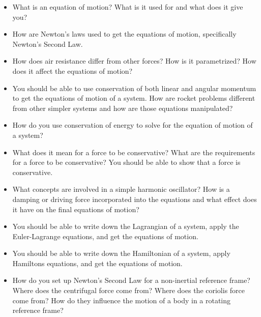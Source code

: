 \begin{itemize}[itemsep=0pt,parsep=0pt,topsep=0pt,partopsep=0pt]
\item What is an equation of motion? What is it used for and what does it give you?
\item How are Newton's laws used to get the equations of motion, specifically
Newton's Second Law.
\item How does air resistance differ from other forces? How is it parametrized?
How does it affect the equations of motion?
\item You should be able to use conservation of both linear and angular momentum
to get the equations of motion of a system. How are rocket problems different
from other simpler systems and how are those equations manipulated?
\item How do you use conservation of energy to solve for the equation
of motion of a system?
\item What does it mean for a force to be conservative? What are the requirements
for a force to be conservative? You should be able to show that a force is
conservative.
\item What concepts are involved in a simple harmonic oscillator? How is a damping or
driving force incorporated into the equations and what effect does it have
on the final equations of motion?
\item You should be able to write down the Lagrangian of a system, apply the Euler-Lagrange
equations, and get the equations of motion.
\item You should be able to write down the Hamiltonian of a system, apply Hamiltons
equations, and get the equations of motion.
\item How do you set up Newton's Second Law for a non-inertial reference frame? Where
does the centrifugal force come from? Where does the coriolis force come from? How
do they influence the motion of a body in a rotating reference frame?
\end{itemize}

